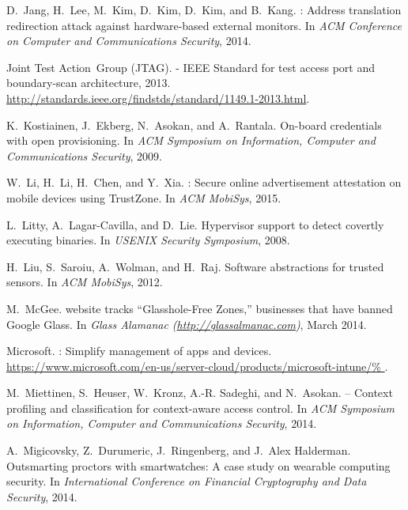 \documentclass[pageno]{sig-alternate-05-2015}
\begin{document}
\begin{thebibliography}{10}
D.~Jang, H.~Lee, M.~Kim, D.~Kim, D.~Kim, and B.~Kang.
: {Address} translation redirection attack against
  hardware-based external monitors.
\newblock In {\em ACM Conference on Computer and Communications Security},
  2014.

Joint Test Action~Group (JTAG).
 - {IEEE} {Standard} for test access port and
  boundary-scan architecture, 2013.
\newblock \url{http://standards.ieee.org/findstds/standard/1149.1-2013.html}.

K.~Kostiainen, J.~Ekberg, N.~Asokan, and A.~Rantala.
\newblock On-board credentials with open provisioning.
\newblock In {\em ACM Symposium on Information, Computer and Communications
  Security}, 2009.

W.~Li, H.~Li, H.~Chen, and Y.~Xia.
: {Secure} online advertisement attestation on mobile
  devices using {TrustZone}.
\newblock In {\em ACM MobiSys}, 2015.

L.~Litty, A.~Lagar-Cavilla, and D.~Lie.
\newblock Hypervisor support to detect covertly executing binaries.
\newblock In {\em USENIX Security Symposium}, 2008.

H.~Liu, S.~Saroiu, A.~Wolman, and H.~Raj.
\newblock Software abstractions for trusted sensors.
\newblock In {\em ACM MobiSys}, 2012.

M.~McGee.
 website tracks ``{Glasshole-Free Zones},'' businesses that have
  banned {Google Glass}.
\newblock In {\em Glass Alamanac (\url{http://glassalmanac.com})}, March 2014.

Microsoft.
: {Simplify management of apps and devices}.
\newblock
  \url{https://www.microsoft.com/en-us/server-cloud/products/microsoft-intune/%
}.

M.~Miettinen, S.~Heuser, W.~Kronz, A.-R. Sadeghi, and N.~Asokan.
 -- {Context} profiling and classification for
  context-aware access control.
\newblock In {\em ACM Symposium on Information, Computer and Communications
  Security}, 2014.

A.~Migicovsky, Z.~Durumeric, J.~Ringenberg, and J.~Alex Halderman.
\newblock Outsmarting proctors with smartwatches: {A} case study on wearable
  computing security.
\newblock In {\em International Conference on Financial Cryptography and Data
  Security}, 2014.


\end{thebibliography}
\end{document}
